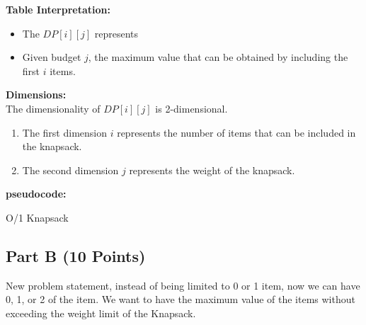 \documentclass{article}[12pt]
\begin{document}
\noindent\textbf{Table Interpretation:} \\
\begin{itemize}
  \item The $DP[i][j]$ represents 
  \item Given budget $j$, the maximum value that can be obtained by including the first $i$ items.
\end{itemize}
\noindent\textbf{Dimensions:} \\
The dimensionality of $DP[i][j]$ is 2-dimensional.
\begin{enumerate}
  \item The first dimension $i$ represents the number of items that can be included in the knapsack.
  \item The second dimension $j$ represents the weight of the knapsack.
\end{enumerate}

\pagebreak
\noindent\textbf{pseudocode:} \\

\begin{algorithm}[H]
 \caption{O/1 Knapsack}

\end{algorithm}

\pagebreak
\subsection{Part B (10 Points)}
New problem statement, instead of being limited to 0 or 1 item, now we can have 0, 1, or 2 of the item.
We want to have the maximum value of the items without exceeding the weight limit of the Knapsack.\\
\end{document}
